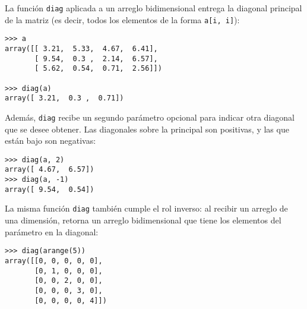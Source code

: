 La función \lstinline!diag! aplicada a un arreglo bidimensional entrega
la diagonal principal de la matriz (es decir, todos los elementos de la
forma \lstinline!a[i, i]!):

\begin{lstlisting}
>>> a
array([[ 3.21,  5.33,  4.67,  6.41],
       [ 9.54,  0.3 ,  2.14,  6.57],
       [ 5.62,  0.54,  0.71,  2.56]])

>>> diag(a)
array([ 3.21,  0.3 ,  0.71])
\end{lstlisting}

Además, \lstinline!diag! recibe un segundo parámetro opcional para
indicar otra diagonal que se desee obtener. Las diagonales sobre la
principal son positivas, y las que están bajo son negativas:

\begin{lstlisting}
>>> diag(a, 2)
array([ 4.67,  6.57])
>>> diag(a, -1)
array([ 9.54,  0.54])
\end{lstlisting}

La misma función \lstinline!diag! también cumple el rol inverso: al
recibir un arreglo de una dimensión, retorna un arreglo bidimensional
que tiene los elementos del parámetro en la diagonal:

\begin{lstlisting}
>>> diag(arange(5))
array([[0, 0, 0, 0, 0],
       [0, 1, 0, 0, 0],
       [0, 0, 2, 0, 0],
       [0, 0, 0, 3, 0],
       [0, 0, 0, 0, 4]])
\end{lstlisting}

